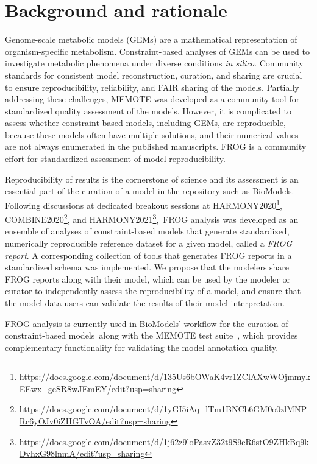 \chapter{Background and rationale}

Genome-scale metabolic models (GEMs) are a mathematical representation of
organism-specific metabolism. Constraint-based analyses of GEMs can be used to
investigate metabolic phenomena under diverse conditions \textit{in silico}.
Community standards for consistent model reconstruction, curation, and sharing
are crucial to ensure reproducibility, reliability, and FAIR sharing of the models. Partially addressing these challenges,
MEMOTE was developed as a community
tool for standardized quality assessment of the models. However, it is
complicated to assess whether constraint-based models, including GEMs, are
reproducible, because these models often have multiple solutions, and their
numerical values are not always enumerated in the published manuscripts. FROG is
a community effort for standardized assessment of model reproducibility.

Reproducibility of results is the cornerstone of science and its assessment is an essential part of the curation of a model in the repository such as BioModels. Following discussions at dedicated breakout sessions at HARMONY2020\footnote{\url{https://docs.google.com/document/d/135Us6bOWaK4vr1ZClAXwWOjmmykEEwx_geSR8wJEmEY/edit?usp=sharing}}, COMBINE2020\footnote{\url{https://docs.google.com/document/d/1yGI5iAq_lTm1BNCb6GM0o0zlMNPRc6yOJv0iZHGTvOA/edit?usp=sharing}}, and HARMONY2021\footnote{\url{https://docs.google.com/document/d/1j62z9loPasxZ32t9S9eR6stO9ZHkBq9kDvhxG98lnmA/edit?usp=sharing}}, FROG analysis was developed as an ensemble of analyses of constraint-based models that generate standardized, numerically reproducible reference dataset for a given model, called a \emph{FROG report}. A corresponding collection of tools that generates FROG reports in a standardized schema was implemented. We propose that the modelers share FROG reports along with their model, which can be used by the modeler or curator to independently assess the reproducibility of a model, and ensure that the model data users can validate the results of their model interpretation.

FROG analysis is currently used in BioModels' workflow for the curation of constraint-based models along with the MEMOTE test suite~\cite{lieven2020memote}, which provides complementary functionality for validating the model annotation quality.

